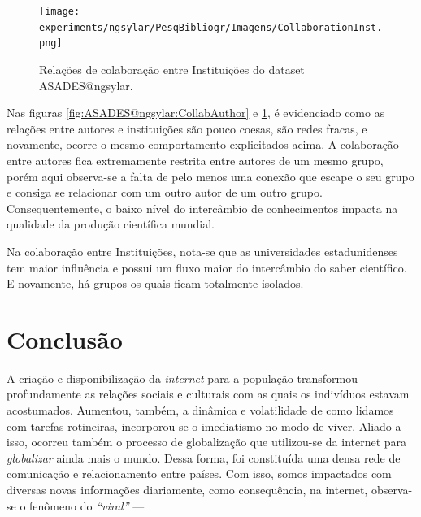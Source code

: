 \begin{figure}[H]
    \centering
\texttt{[image: experiments/ngsylar/PesqBibliogr/Imagens/CollaborationInst.png]}
    \caption{Relações de colaboração entre Instituições do dataset ASADES@ngsylar.}
    \label{fig:ASADES@ngsylar:CollabInst}
\end{figure}

Nas figuras \ref{fig:ASADES@ngsylar:CollabAuthor} e \ref{fig:ASADES@ngsylar:CollabInst}, é evidenciado como as relações entre autores e instituições são pouco coesas, são redes fracas, e novamente, ocorre o mesmo comportamento explicitados acima. A colaboração entre autores fica extremamente restrita entre autores de um mesmo grupo, porém aqui observa-se a falta de pelo menos uma conexão que escape o seu grupo e consiga se relacionar com um outro autor de um outro grupo. Consequentemente, o baixo nível do intercâmbio de conhecimentos impacta na qualidade da produção científica mundial. 


Na colaboração entre Instituições, nota-se que as universidades estadunidenses tem maior influência e possui um fluxo maior do intercâmbio do saber científico. E novamente, há grupos os quais ficam totalmente isolados. 

\section{Conclusão}
A criação e disponibilização da \textit{internet} para a população transformou profundamente as relações sociais e culturais com as quais os indivíduos estavam acostumados. Aumentou, também, a dinâmica e volatilidade de como lidamos com tarefas rotineiras, incorporou-se o imediatismo no modo de viver. Aliado a isso, ocorreu também o processo de globalização que utilizou-se da internet para \textit{globalizar} ainda mais o mundo. Dessa forma, foi constituída uma densa rede de comunicação e relacionamento entre países. Com isso, somos impactados com diversas novas informações diariamente, como consequência, na internet, observa-se o fenômeno do \textit{``viral''} --- 